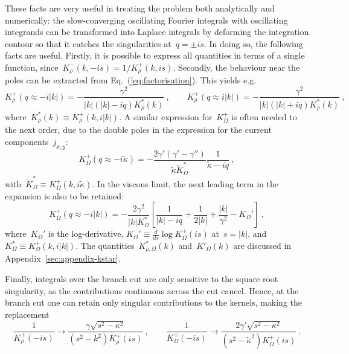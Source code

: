 \documentclass[preprint,aps,eqsecnum]{revtex4-1}
\newcommand{\fplus}[1]{{#1}^{+}}
\newcommand{\fminus}[1]{{#1}^{-}}
\begin{document}
These facts are very useful in treating the problem both analytically and
numerically: the slow-converging oscillating Fourier integrals with
oscillating integrands can be transformed into Laplace
integrals by deforming the integration contour so that
it catches the singularities at~$q = \pm is$.
In doing so, the following facts are useful. Firstly,
it is possible to express all quantities in terms of a single function,
 since~$\fminus{K}_\rho(k, -is) = 1/\fplus{K}_\rho(k, is)$.  Secondly,
the behaviour near the poles can be extracted from
Eq.~(\ref{eq:factorisation}). This yields e.g. \begin{equation}
  \fplus{K}_\rho (q \approx -i |k|)
  = - \frac{\gamma^2}{|k|(|k| - i q) K_\rho^\ast(k)}
  \ ,
  \qquad
  \fplus{K}_{\rho}(q \approx i |k|) = - \frac{\gamma^2}{|k|(|k| + iq)
    K_\rho^\ast(k)}
  \ , 
\end{equation}
 where~$K_\rho^\ast(k) \equiv \fplus{K}_\rho(k, i|k|)$. A similar expression
 for~$\fplus{K}_\Omega$ is often needed to the next order, due to the double poles in the expression for the current components~$j_{x, y}$:
 \begin{equation}
 \fplus{K}_\Omega(q \approx -i {\tilde \kappa})
 = - \frac{2 \gamma' (\gamma' - \gamma'') }{{\tilde \kappa}
     {\tilde K}_\Omega^\ast}
      \frac{1}{{\tilde \kappa} - i q}
 \ ,
\end{equation}
with~${\tilde K}_\Omega^\ast \equiv \fplus{K}_\Omega(k, i{\tilde \kappa})$.
In the viscous limit, the next leading term in the expansion
is also to be retained:
 \begin{equation}
 \fplus{K}_\Omega(q \approx -i |k|)
 = - \frac{2 \gamma^2 }{|k| K_\Omega^\ast}
      \left[
      \frac{1}{|k| - i q}
       + \frac{1}{2|k|} + \frac{|k|}{\gamma^2} - K_\Omega'\right]
 \ ,
\end{equation}
where~$K_\Omega'$ is the log-derivative,
$K_\Omega' \equiv \frac{d}{ds} \log \fplus{K}_\Omega(is)$ at~$s = |k|$,
and~$K_\Omega^\ast \equiv \fplus{K}_\Omega(k, i|k|)$.
The quantities~$K_{\rho,\Omega}^\ast(k)$ and~$K'_\Omega(k)$ are discussed
in Appendix~\ref{sec:appendix-kstar}.

Finally, integrals over the branch cut are only sensitive
to the square root singularity, as the contributions continuous
across the cut cancel.
Hence, at the branch cut one can retain only singular contributions
to the kernels, making the replacement
\begin{equation}
  \frac{1}{\fplus{K}_\rho (-is)} \to
   \frac{\gamma\sqrt{s^2 - \kappa^2}}{(s^2 - k^2) \fplus{K}_\rho(is)}
  \ , \qquad
  \frac{1}{\fplus{K}_\Omega(-is)} \to
  \frac{2 \gamma' \sqrt{s^2 - \kappa^2}}{(s^2 - {\tilde \kappa}^2)
  \fplus{K}_\Omega(is)}
  \ .
\end{equation}
\end{document}
